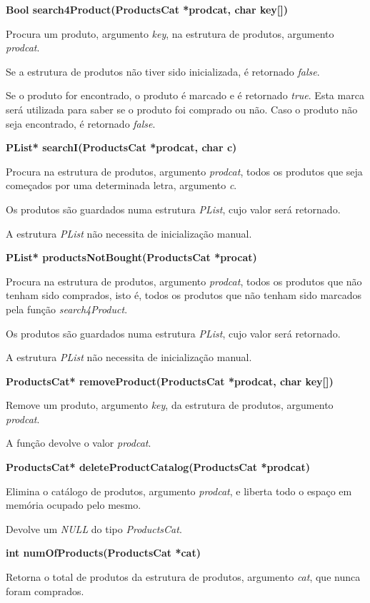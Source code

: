 \documentclass[10pt] {article}
\begin{document}
\noindent \textbf{Bool search4Product(ProductsCat *prodcat, char key[])}
\par Procura um produto, argumento \emph{key}, na estrutura de produtos, argumento \emph{prodcat}.
\par Se a estrutura de produtos não tiver sido inicializada, é retornado \emph{false}.
\par Se o produto for encontrado, o produto é marcado e é retornado \emph{true}. Esta marca será utilizada para saber se o produto foi comprado ou não. Caso o produto não seja encontrado, é retornado \emph{false}.

\noindent \textbf{PList* searchI(ProductsCat *prodcat, char c)}
\par Procura na estrutura de produtos, argumento \emph{prodcat}, todos os produtos que seja começados por uma determinada letra, argumento \emph{c}.
\par Os produtos são guardados numa estrutura \emph{PList}, cujo valor será retornado.
\par A estrutura \emph{PList} não necessita de inicialização manual.

\noindent \textbf{PList* productsNotBought(ProductsCat *procat)}
\par Procura na estrutura de produtos, argumento \emph{prodcat}, todos os produtos que não tenham sido comprados, isto é, todos os produtos que não tenham sido marcados pela função \emph{search4Product}.
\par Os produtos são guardados numa estrutura \emph{PList}, cujo valor será retornado.
\par A estrutura \emph{PList} não necessita de inicialização manual.

\noindent \textbf{ProductsCat* removeProduct(ProductsCat *prodcat, char key[])}
\par Remove um produto, argumento \emph{key}, da estrutura de produtos, argumento \emph{prodcat}.
\par A função devolve o valor \emph{prodcat}.

\noindent \textbf{ProductsCat* deleteProductCatalog(ProductsCat *prodcat)}
\par Elimina o catálogo de produtos, argumento \emph{prodcat}, e liberta todo o espaço em memória ocupado pelo mesmo.
\par Devolve um \emph{NULL} do tipo \emph{ProductsCat}.

\noindent \textbf{int numOfProducts(ProductsCat *cat)}
\par Retorna o total de produtos da estrutura de produtos, argumento \emph{cat}, que nunca foram comprados.
\end{document}
